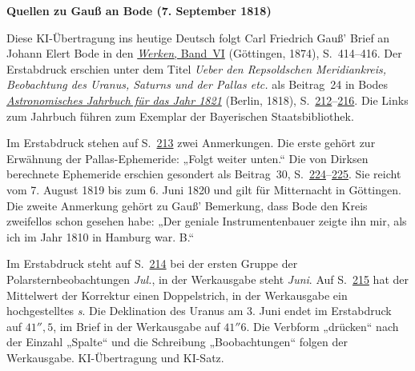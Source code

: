 \clearpage\thispagestyle{empty}
\begin{center}\textbf{Quellen zu Gauß an Bode (7. September 1818)}\end{center}
\noindent Diese KI-Übertragung ins heutige Deutsch folgt Carl Friedrich Gauß’ Brief an Johann Elert Bode in den \href{https://gdz.sub.uni-goettingen.de/id/PPN236007467}{\textit{Werken}, Band~VI} (Göttingen, 1874), S.~414--416. Der Erstabdruck erschien unter dem Titel \textit{Ueber den Repsoldschen Meridiankreis, Beobachtung des Uranus, Saturns und der Pallas etc.} als Beitrag~24 in Bodes \href{https://api.digitale-sammlungen.de/iiif/image/v2/bsb10538350_00003/full/1600,/0/default.jpg}{\textit{Astronomisches Jahrbuch für das Jahr 1821}} (Berlin, 1818), S.~\href{https://api.digitale-sammlungen.de/iiif/image/v2/bsb10538350_00218/full/1600,/0/default.jpg}{212}--\href{https://api.digitale-sammlungen.de/iiif/image/v2/bsb10538350_00222/full/1600,/0/default.jpg}{216}. Die Links zum Jahrbuch führen zum Exemplar der Bayerischen Staatsbibliothek.
\par\smallskip\noindent Im Erstabdruck stehen auf S.~\href{https://api.digitale-sammlungen.de/iiif/image/v2/bsb10538350_00219/full/1600,/0/default.jpg}{213} zwei Anmerkungen. Die erste gehört zur Erwähnung der Pallas-Ephemeride: „Folgt weiter unten.“ Die von Dirksen berechnete Ephemeride erschien gesondert als Beitrag~30, S.~\href{https://api.digitale-sammlungen.de/iiif/image/v2/bsb10538350_00230/full/1600,/0/default.jpg}{224}--\href{https://api.digitale-sammlungen.de/iiif/image/v2/bsb10538350_00231/full/1600,/0/default.jpg}{225}. Sie reicht vom 7. August 1819 bis zum 6. Juni 1820 und gilt für Mitternacht in Göttingen. Die zweite Anmerkung gehört zu Gauß’ Bemerkung, dass Bode den Kreis zweifellos schon gesehen habe: „Der geniale Instrumentenbauer zeigte ihn mir, als ich im Jahr 1810 in Hamburg war. B.“
\par\smallskip\noindent Im Erstabdruck steht auf S.~\href{https://api.digitale-sammlungen.de/iiif/image/v2/bsb10538350_00220/full/1600,/0/default.jpg}{214} bei der ersten Gruppe der Polarsternbeobachtungen \textit{Jul.}, in der Werkausgabe steht \textit{Juni}. Auf S.~\href{https://api.digitale-sammlungen.de/iiif/image/v2/bsb10538350_00221/full/1600,/0/default.jpg}{215} hat der Mittelwert der Korrektur einen Doppelstrich, in der Werkausgabe ein hochgestelltes \textit{s}. Die Deklination des Uranus am 3. Juni endet im Erstabdruck auf $41'',5$, im Brief in der Werkausgabe auf $41''6$. Die Verbform „drücken“ nach der Einzahl „Spalte“ und die Schreibung „Boobachtungen“ folgen der Werkausgabe. KI-Übertragung und KI-Satz.
\clearpage
